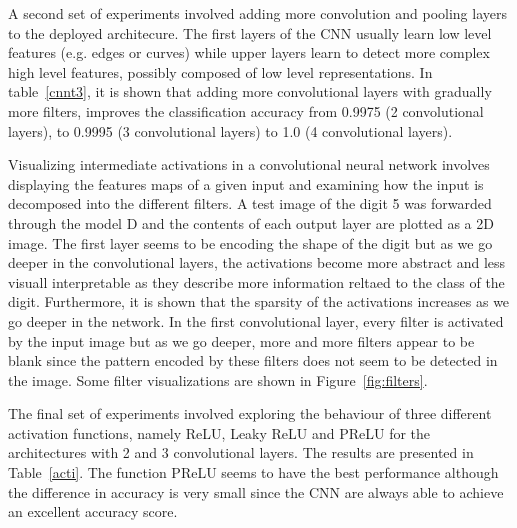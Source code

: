 \documentclass[conference,compsoc]{IEEEtran}
\begin{document}
A second set of experiments involved adding more convolution and pooling layers to the deployed architecure. The first layers of the CNN usually learn low level features (e.g. edges or curves) while upper layers learn to detect more complex high level features, possibly composed of low level representations. In table~\ref{cnnt3}, it is shown that adding more convolutional layers with gradually more filters, improves the classification accuracy from 0.9975 (2 convolutional layers), to 0.9995 (3 convolutional layers) to 1.0 (4 convolutional layers). 

Visualizing intermediate activations in a convolutional neural network involves displaying the features maps of a given input and examining how the input is decomposed into the different filters. A test image of the digit 5 was forwarded through the model D and the contents of each output layer are plotted as a 2D image. The first layer seems to be encoding the shape of the digit but as we go deeper in the convolutional layers, the activations become more abstract and less visuall interpretable as they describe more information reltaed to the class of the digit. Furthermore, it is shown that the sparsity of the activations increases as we go deeper in the network. In the first convolutional layer, every filter is activated by the input image but as we go deeper, more and more filters appear to be blank since the pattern encoded by these filters does not seem to be detected in the image. Some filter visualizations are shown in Figure~\ref{fig:filters}.

The final set of experiments involved exploring the behaviour of three different activation functions, namely ReLU, Leaky ReLU and PReLU for the architectures with 2 and 3 convolutional layers. The results are presented in Table~\ref{acti}. The function PReLU seems to have the best performance although the difference in accuracy is very small since the CNN are always able to achieve an excellent accuracy score.
\end{document}
